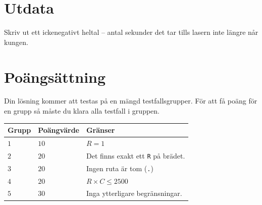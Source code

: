 \section*{Utdata}
Skriv ut ett ickenegativt heltal -- antal sekunder det tar tills lasern inte längre når kungen.

\section*{Poängsättning}
Din lösning kommer att testas på en mängd testfallsgrupper.
För att få poäng för en grupp så måste du klara alla testfall i gruppen.

\noindent
\begin{tabular}{| l | l | l |}
\hline
Grupp & Poängvärde & Gränser \\ \hline
$1$    & $10$       &  $R=1$ \\ \hline
$2$    & $20$       &  Det finns exakt ett \texttt{R} på brädet. \\ \hline
$3$    & $20$       &  Ingen ruta är tom (\texttt{.}) \\ \hline
$4$    & $20$       &  $R\times C \leq 2500$ \\ \hline
$5$    & $30$       &  Inga ytterligare begränsningar. \\ \hline
\end{tabular}

